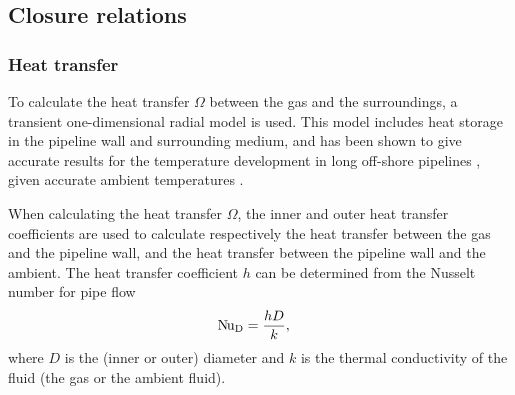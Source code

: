\subsection{Closure relations}
\label{sec:closure}
\subsubsection{Heat transfer}
To calculate the heat transfer $\Omega$ between the gas and the surroundings, a transient one-dimensional radial model \cite{Chaczykowski2010Transient} is used. This model includes heat storage in the pipeline wall and surrounding medium, and has been shown to give accurate results for the temperature development in long off-shore pipelines \cite{Helgaker2014Validation,Oosterkamp2015Modelling,Oosterkamp2016Heat}, given accurate ambient temperatures \cite{Sund2015Pipeline}.

When calculating the heat transfer $\Omega$, the inner and outer heat transfer coefficients are used to calculate respectively the heat transfer between the gas and the pipeline wall, and the heat transfer between the pipeline wall and the ambient. The heat transfer coefficient $h$ can be determined from the Nusselt number for pipe flow
\begin{align}
    &\operatorname{N\kern-.09em u}_\mathrm{D} = \frac{hD}{k}
,
\end{align}
where $D$ is the (inner or outer) diameter and $k$ is the thermal conductivity of the fluid (the gas or the ambient fluid).

